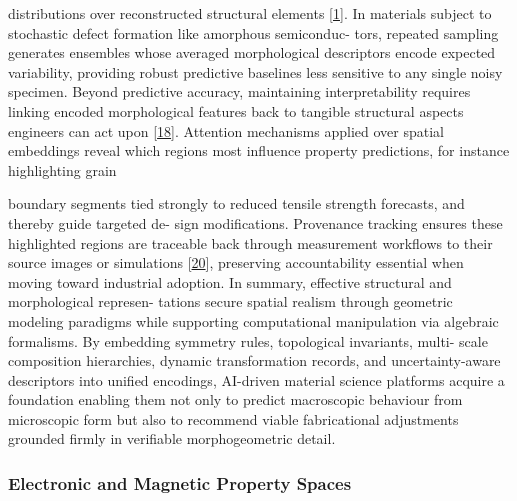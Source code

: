 \documentclass[
]{article}
\begin{document}
distributions over reconstructed structural elements
{[}\hyperref[_bookmark41]{1}{]}. In materials subject to stochastic
defect formation like amorphous semiconduc- tors, repeated sampling
generates ensembles whose averaged morphological descriptors encode
expected variability, providing robust predictive baselines less
sensitive to any single noisy specimen. Beyond predictive accuracy,
maintaining interpretability requires linking encoded morphological
features back to tangible structural aspects engineers can act upon
{[}\hyperref[_bookmark58]{18}{]}. Attention mechanisms applied over
spatial embeddings reveal which regions most influence property
predictions, for instance highlighting grain

boundary segments tied strongly to reduced tensile strength forecasts,
and thereby guide targeted de- sign modifications. Provenance tracking
ensures these highlighted regions are traceable back through measurement
workflows to their source images or simulations
{[}\hyperref[_bookmark60]{20}{]}, preserving accountability essential
when moving toward industrial adoption. In summary, effective structural
and morphological represen- tations secure spatial realism through
geometric modeling paradigms while supporting computational manipulation
via algebraic formalisms. By embedding symmetry rules, topological
invariants, multi- scale composition hierarchies, dynamic transformation
records, and uncertainty-aware descriptors into unified encodings,
AI-driven material science platforms acquire a foundation enabling them
not only to predict macroscopic behaviour from microscopic form but also
to recommend viable fabricational adjustments grounded firmly in
verifiable morphogeometric detail.

\subsubsection{Electronic and Magnetic Property
Spaces}\label{electronic-and-magnetic-property-spaces}
\end{document}
